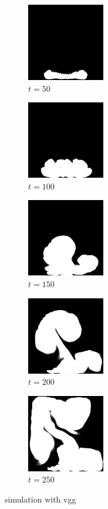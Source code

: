 \documentclass[a4paper,12pt,twoside]{report}
\begin{document}
\begin{figure}
\centering
\begin{subfigure}{0.18\textwidth}
  \centering
  \includegraphics[scale=0.56]{buoyancy/dens_000050_vgg.png}
  \caption{$t=50$}
\end{subfigure}
\begin{subfigure}{0.18\textwidth}
  \centering
  \includegraphics[scale=0.56]{buoyancy/dens_000100_vgg.png}
  \caption{$t=100$}
\end{subfigure}
\begin{subfigure}{0.18\textwidth}
  \centering
  \includegraphics[scale=0.56]{buoyancy/dens_000150_vgg.png}
  \caption{$t=150$}
\end{subfigure}
\begin{subfigure}{0.18\textwidth}
  \centering
  \includegraphics[scale=0.56]{buoyancy/dens_000200_vgg.png}
  \caption{$t=200$}
\end{subfigure}
\begin{subfigure}{0.18\textwidth}
  \centering
  \includegraphics[scale=0.56]{buoyancy/dens_000249_vgg.png}
  \caption{$t=250$}
\end{subfigure}
\caption{simulation with vgg}
\end{figure}
\end{document}
